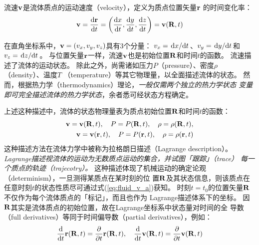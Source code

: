 \documentclass[UTF8]{ctexbook}
\begin{document}
流速$\vb{v}$是流体质点的运动速度（velocity），定义为质点位置矢量$\vb{r}$
的时间变化率：
$$\vb{v}=\dv{\vb{r}}{t} = \qty(\dv{x}{t}, \dv{y}{t},\dv{z}{t}) =
\vb{v}(\vb{R},t)$$

在直角坐标系中，$\vb{v}=\qty(v_x,v_y,v_z)$具有3个分量：
$v_x = \dv*{x}{t}$、$v_y=\dv*{y}{t}$和$v_z=\dv*{z}{t}$。
与位置矢量$\vb{r}$一样，流速$\vb{v}$也是初始位置$\vb{R}$和时间$t$的函数。
流速描述了流体的运动状态。
除此之外，尚需诸如压力$P$（pressure）、密度$\rho$（density）、温度$T$
（temperature）等其它物理量，以全面描述流体的状态。
然而，根据热力学（thermodynamics）理论，\emph{一般仅需两个独立的热力学状态
	变量即可完全描述流体的热力学状态}，余者悉可经状态方程确定。

上述这种描述中，流体的状态物理量表为质点初始位置$\vb{R}$和时间$t$的函数：
\begin{subequations}
\begin{align}
		\vb{v} = \vb{v}(\vb{R},t)\qc P = P(\vb{R},t)\qc \rho = \rho(\vb{R},
		t),\label{eq:fluid_v_a}\\
		\label{eq:fluid_v_b}
		\vb{v} = \vb{v}(\vb{r},t)\qc P = P(\vb{r},t)\qc \rho = \rho(\vb{r},
		t)
\end{align}
\end{subequations}
这种描述方法在流体力学中被称为拉格朗日描述（Lagrange description）。
\emph{Lagrange描述视流体的运动为无数质点运动的集合，并试图「跟踪」（trace）
	每一个质点的轨迹（trajecotry）。}
这种描述体现了机械运动的确定论观（determinism），一旦测得某质点在某时刻的位
置$\vb{R}$及其状态信息，则该质点在任意时刻$t$的状态性质尽可通过式(\ref{eq:fluid_v_a})获知。
时刻$t=t_0$的位置矢量$\vb{R}$不仅作为每个流体质点的「标记」，而且也作为
Lagrange描述体系下的坐标。
因$\vb{R}$其实是流体质点的初始位置，故在Lagrange坐标系中状态量对时间的全
导数（full derivatives）等同于时间偏导数（partial derivatives），例如：
$$\dv{t} \vb{r}(\vb{R},t) = \pdv{t} \vb{r}(\vb{R},t)\qc 
\dv{t} \vb{v}(\vb{R},t) = \pdv{t} \vb{v} (\vb{R},t)$$
\end{document}
